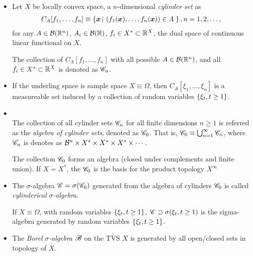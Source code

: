\documentclass[11pt]{article}
\begin{document}
\begin{itemize}
\item 
\begin{definition}
Let $X$ be locally convex space, a $n$-dimensional \emph{cylinder set} as \citep{lifshits2013gaussian}
\begin{align*}
C_{A}[f_{1},\ldots, f_{n}]\equiv \left\{\boldsymbol{x}\,|\, \left(f_{1}(\boldsymbol{x}),  \ldots, f_{n}(\boldsymbol{x})\right) \in A\;  \right\}, n=1,2,\ldots,
\end{align*}
for any $A\in {\mathcal B}({\mathbb R}^{n})$, $A_{i}\in {\mathcal B}({\mathbb R})$, $f_{i}\in X^{*}\subset {\mathbb R}^{X}$, the dual space of continuous linear functional on $X$.

The collection of $C_{A}[f_{1},\ldots, f_{n}]$ with all possible $A\in {\mathcal B}({\mathbb R}^{n})$, and all $f_{i}\in X^{*}\subset {\mathbb R}^{X}$ is denoted as ${\mathscr C}_{n}$.
\end{definition}

\item  If the underling space is sample space $X\equiv \Omega$, then $C_{A}[\xi_{1}, \ldots, \xi_{n}]$ is a measureable set induced by a collection of random variables $\left\{\xi_{t}, t\ge 1\right\}$. \\

\item  \begin{definition}\citep{lifshits2013gaussian}\\
The collection of all cylinder sets ${\mathscr C}_{n}$  for all finite dimensions $n\ge 1$ is referred as the \emph{algebra of cylinder sets}, denoted as ${\mathscr C}_{0}$. That is, ${\mathscr C}_{0}\equiv \bigcup_{n=1}^{\infty}{\mathscr C}_{n}$, where ${\mathscr C}_{n}$ is denotes as ${\mathcal B}^{n}\times X^{*}\times X^{*} \times X^{*} \times \cdots$.

The collection ${\mathscr C}_{0}$ forms an algebra (closed under complements and finite union).  If $X= X^{*}$, the ${\mathscr C}_{0}$ is the basis for the product topology $X^{\infty}$
\end{definition} 


\item \begin{definition}
 The $\sigma$-algebra ${\mathscr C} = \sigma({\mathscr C}_{0})$ generated from the algebra of cylinders ${\mathscr C}_{0}$ is called \emph{cylinderical $\sigma$-algebra}. 

If $X\equiv \Omega$, with random variables $\left\{\xi_{t}, t\ge 1\right\}$, ${\mathscr C} \supset \sigma(\xi_{t}, t\ge 1)$ is the sigma-algebra generated by  random variables $\left\{\xi_{t}, t\ge 1\right\}$.
 \end{definition}
 
\item \begin{definition}
The \emph{Borel $\sigma$-algebra} ${\mathscr B}$ on the TVS $X$ is generated by all open/closed sets in topology of $X$.  %
 \end{definition}
 

\end{itemize}
\end{document}
